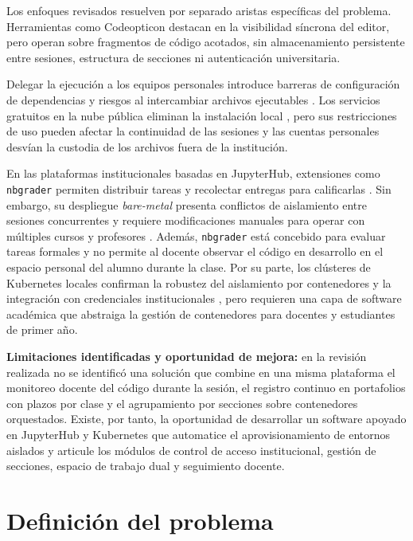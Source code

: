 Los enfoques revisados resuelven por separado aristas específicas del problema. Herramientas como Codeopticon \cite{guo2015codeopticon} destacan en la visibilidad síncrona del editor, pero operan sobre fragmentos de código acotados, sin almacenamiento persistente entre sesiones, estructura de secciones ni autenticación universitaria.

Delegar la ejecución a los equipos personales introduce barreras de configuración de dependencias y riesgos al intercambiar archivos ejecutables \cite{johnson2020benefits}. Los servicios gratuitos en la nube pública eliminan la instalación local \cite{xu2023teaching}, pero sus restricciones de uso pueden afectar la continuidad de las sesiones y las cuentas personales desvían la custodia de los archivos fuera de la institución.

En las plataformas institucionales basadas en JupyterHub, extensiones como \texttt{nbgrader} permiten distribuir tareas y recolectar entregas para calificarlas \cite{flemming2022jupyterhub}. Sin embargo, su despliegue \textit{bare-metal} presenta conflictos de aislamiento entre sesiones concurrentes y requiere modificaciones manuales para operar con múltiples cursos y profesores \cite{flemming2022jupyterhub}. Además, \texttt{nbgrader} está concebido para evaluar tareas formales y no permite al docente observar el código en desarrollo en el espacio personal del alumno durante la clase. Por su parte, los clústeres de Kubernetes locales confirman la robustez del aislamiento por contenedores y la integración con credenciales institucionales \cite{linhuber2026kubernetes}, pero requieren una capa de software académica que abstraiga la gestión de contenedores para docentes y estudiantes de primer año.

\textbf{Limitaciones identificadas y oportunidad de mejora:} en la revisión realizada no se identificó una solución que combine en una misma plataforma el monitoreo docente del código durante la sesión, el registro continuo en portafolios con plazos por clase y el agrupamiento por secciones sobre contenedores orquestados. Existe, por tanto, la oportunidad de desarrollar un software apoyado en JupyterHub y Kubernetes que automatice el aprovisionamiento de entornos aislados y articule los módulos de control de acceso institucional, gestión de secciones, espacio de trabajo dual y seguimiento docente.




\section{Definición del problema}
\label{sec:definicion_del_problema}

